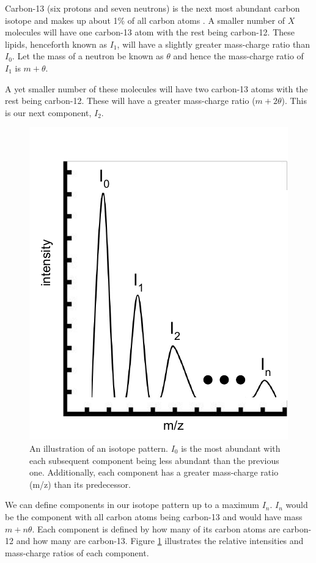 \documentclass{l4proj}
\begin{document}
Carbon-13 (six protons and seven neutrons) is the next most abundant carbon isotope and makes up about 1\% of all carbon atoms \citep{carbon13}. A smaller number of $X$ molecules will have one carbon-13 atom with the rest being carbon-12. These lipids, henceforth known as $I_1$, will have a slightly greater mass-charge ratio than $I_0$. Let the mass of a neutron be known as $\theta$ and hence the mass-charge ratio of $I_1$ is $m+\theta$.

A yet smaller number of these molecules will have two carbon-13 atoms with the rest being carbon-12. These will have a greater mass-charge ratio ($m+2\theta$). This is our next component, $I_2$. 
\begin{figure}[htb]
    \centering
    \includegraphics{dissertation/images/intensities_new_1.pdf}
    \caption{An illustration of an isotope pattern. $I_0$ is the most abundant with each subsequent component being less abundant than the previous one. Additionally, each component has a greater mass-charge ratio (m/z) than its predecessor.}
    \label{fig:isotopomers}
\end{figure}


We can define components in our isotope pattern up to a maximum $I_n$. $I_n$ would be the component with all carbon atoms being carbon-13 and would have mass $m+n\theta$. Each component is defined by how many of its carbon atoms are carbon-12 and how many are carbon-13. Figure \ref{fig:isotopomers} illustrates the relative intensities and mass-charge ratios of each component.
\end{document}
